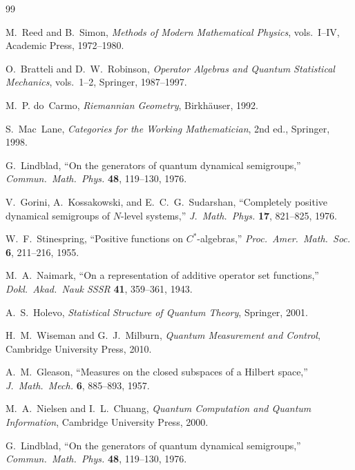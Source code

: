 \documentclass[11pt,a4paper,openany]{book}
\theoremstyle{remark}
\begin{document}
\begin{thebibliography}{99}

M.~Reed and B.~Simon,
\emph{Methods of Modern Mathematical Physics},
vols.~I--IV, Academic Press, 1972--1980.

O.~Bratteli and D.~W.~Robinson,
\emph{Operator Algebras and Quantum Statistical Mechanics},
vols.~1--2, Springer, 1987--1997.

M.~P. do~Carmo,
\emph{Riemannian Geometry},
Birkh\"auser, 1992.

S.~Mac~Lane,
\emph{Categories for the Working Mathematician},
2nd ed., Springer, 1998.

G.~Lindblad,
``On the generators of quantum dynamical semigroups,''
\emph{Commun.\ Math.\ Phys.} \textbf{48}, 119--130, 1976.

V.~Gorini, A.~Kossakowski, and E.~C.~G.~Sudarshan,
``Completely positive dynamical semigroups of $N$-level systems,''
\emph{J.\ Math.\ Phys.} \textbf{17}, 821--825, 1976.

W.~F.~Stinespring,
``Positive functions on $C^*$-algebras,''
\emph{Proc.\ Amer.\ Math.\ Soc.} \textbf{6}, 211--216, 1955.

M.~A.~Naimark,
``On a representation of additive operator set functions,''
\emph{Dokl.\ Akad.\ Nauk SSSR} \textbf{41}, 359--361, 1943.

A.~S.~Holevo,
\emph{Statistical Structure of Quantum Theory},
Springer, 2001.

H.~M.~Wiseman and G.~J.~Milburn,
\emph{Quantum Measurement and Control},
Cambridge University Press, 2010.

A.~M.~Gleason,
``Measures on the closed subspaces of a Hilbert space,''
\emph{J.\ Math.\ Mech.} \textbf{6}, 885--893, 1957.

M.~A.~Nielsen and I.~L.~Chuang,
\emph{Quantum Computation and Quantum Information},
Cambridge University Press, 2000.

G.~Lindblad,
``On the generators of quantum dynamical semigroups,''
\emph{Commun.\ Math.\ Phys.} \textbf{48}, 119--130, 1976.


\end{thebibliography}
\end{document}
